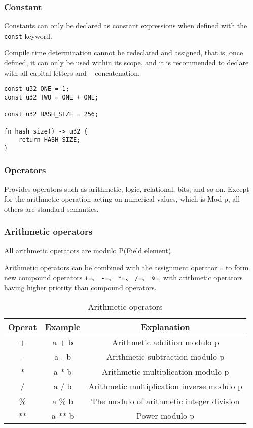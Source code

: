 \subsubsection{Constant}

Constants can only be declared as constant expressions when defined with the \texttt{const} keyword.

Compile time determination cannot be redeclared and assigned, that is, once defined, it can only be used within its scope, and it is recommended to declare with all capital letters and \texttt{\_} concatenation. 

\begin{lstlisting}
const u32 ONE = 1;
const u32 TWO = ONE + ONE;

const u32 HASH_SIZE = 256;

fn hash_size() -> u32 {
    return HASH_SIZE;
}
\end{lstlisting}

\subsubsection{Operators}

Provides operators such as arithmetic, logic, relational, bits, and so on. Except for the arithmetic operation acting on numerical values, which is Mod p, all others are standard semantics. 

\subsubsection*{Arithmetic operators}

All arithmetic operators are modulo P(Field element).

Arithmetic operators can be combined with the assignment operator \texttt{=} to form new compound operators \texttt{+=}、 \texttt{-=}、 \texttt{*=}、 \texttt{/=}、 \texttt{\%=}, with arithmetic operators having higher priority than compound operators. 

\begin{table}
\centering
\begin{tabular}{c|c|c}
Operat & Example & Explanation \\ \hline
+ & a + b & Arithmetic addition modulo p \\
- & a - b & Arithmetic subtraction modulo p \\
* & a * b & Arithmetic multiplication modulo p \\
/ & a / b & Arithmetic multiplication inverse modulo p \\
\% & a \% b & The modulo of arithmetic integer division \\
** & a ** b & Power modulo p \\
\end{tabular}
\caption{Arithmetic operators}
\end{table}

